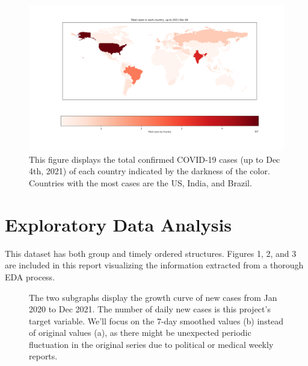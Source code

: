 \documentclass[11pt]{article}
\begin{document}
\begin{figure}[htb]
	\setlength{\abovecaptionskip}{-0.5cm}
	\centering
	\includegraphics[width=0.9\linewidth]{../figures/total-cases-heatmap.png} %
	\caption{This figure displays the total confirmed COVID-19 cases (up to Dec 4th, 2021) of each country indicated by the darkness of the color. Countries with the most cases are the US, India, and Brazil.}
\end{figure}

\section{Exploratory Data Analysis}
This dataset has both group and timely ordered structures. Figures 1, 2, and 3 are included in this report visualizing the information extracted from a thorough EDA process. 


\begin{figure}[htb]
	\centering
	\vspace{-0.1in}\hspace{-0.3in}
	\caption{The two subgraphs display the growth curve of new cases from Jan 2020 to Dec 2021. The number of daily new cases is this project's target variable. We'll focus on the 7-day smoothed values (b) instead of original values (a), as there might be unexpected periodic fluctuation in the original series due to political or medical weekly reports.}
\end{figure}
\end{document}
